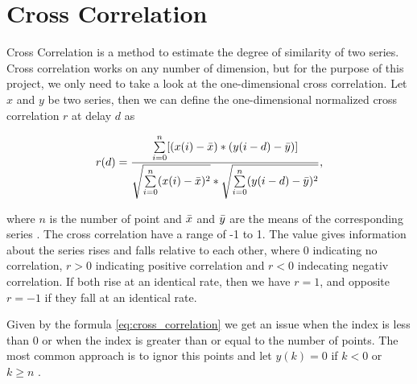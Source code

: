 \section{Cross Correlation}
\label{sec:cross_correlation}
Cross Correlation is a method to estimate the degree of similarity of two series. Cross correlation works on any number of dimension, but for the purpose of this project, we only need to take a look at the one-dimensional cross correlation. Let $x$ and $y$ be two series, then we can define the one-dimensional normalized cross correlation $r$ at delay $d$ as	

\begin{equation}
\label{eq:cross_correlation}
    r(d) = \frac{\sum\limits_{i=0}\limits^{n} [(x(i) - \bar{x}) * (y(i-d) - \bar{y})]}{\sqrt{\sum\limits_{i=0}\limits^{n} (x(i) - \bar{x})^{2}} * \sqrt{\sum\limits_{i=0}\limits^{n} (y(i-d) - \bar{y})^{2}}},
\end{equation}

where $n$ is the number of point and $\bar{x}$ and $\bar{y}$ are the means of the corresponding series \cite{cross_correlation_theory}. The cross correlation have a range of -1 to 1. The value gives information about the series rises and falls relative to each other, where 0 indicating no correlation, $r > 0$ indicating positive correlation and  $r < 0$ indecating negativ correlation. If both rise at an identical rate, then we have $r = 1$, and opposite $r = -1$ if they fall at an identical rate. 

Given by the formula \ref{eq:cross_correlation} we get an issue when the index is less than 0 or when the index is greater than or equal to the number of points. The most common approach is to ignor this points and let $y(k) = 0$ if $k < 0$ or $k \geq n$ \cite{cross_correlation_code}.